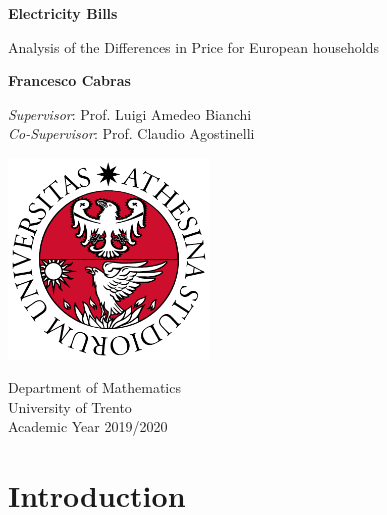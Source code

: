 \documentclass[a4paper,12pt]{book}
\begin{document}
\frontmatter
\begin{titlepage}
    \begin{center}
        \vspace*{1cm}
            
        \LARGE
        \textbf{Electricity Bills}
            
        \vspace{0.5cm}
        \large
        Analysis of the Differences in Price for European households
            
        \vspace{1.5cm}
            
        \textbf{Francesco Cabras}
            
        \vfill
        \textit{Supervisor}: Prof. Luigi Amedeo Bianchi\\
        \textit{Co-Supervisor}: Prof. Claudio Agostinelli
            
        \vspace{1.5cm}
            
        \includegraphics[width=0.4\textwidth]{Images/uni}
         
        Department of Mathematics\\
        University of Trento\\
        Academic Year 2019/2020
            
    \end{center}
\end{titlepage}

\tableofcontents

\mainmatter
\chapter{Introduction}
\end{document}
